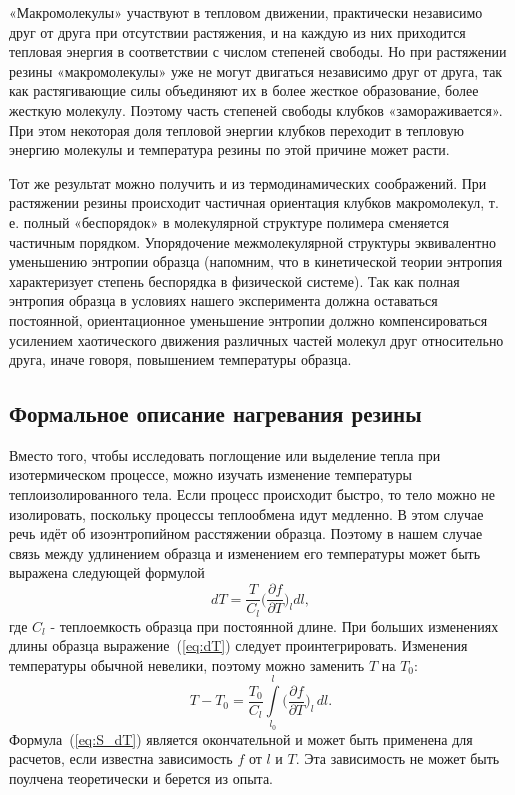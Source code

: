 \documentclass[a4paper,12pt]{article} %
\begin{document}
		«Макромолекулы» участвуют в тепловом движении, практически независимо друг от друга при отсутствии растяжения, и на каждую из них приходится тепловая энергия в соответствии с числом степеней свободы. Но при растяжении резины «макромолекулы» уже не могут двигаться независимо друг от друга, так как растягивающие силы объединяют их в более жесткое образование, более жесткую молекулу. Поэтому часть степеней свободы клубков «замораживается». При этом некоторая доля тепловой энергии клубков переходит в тепловую энергию молекулы и температура резины по этой причине может расти.
	
		Тот же результат можно получить и из термодинамических соображений. При растяжении резины происходит частичная ориентация клубков макромолекул, т. е. полный «беспорядок» в молекулярной структуре полимера сменяется частичным порядком. Упорядочение межмолекулярной структуры эквивалентно уменьшению энтропии образца (напомним, что в кинетической теории энтропия характеризует степень беспорядка в физической системе). Так как полная энтропия образца в условиях нашего эксперимента должна оставаться постоянной, ориентационное уменьшение энтропии должно компенсироваться усилением хаотического движения различных частей молекул друг относительно друга, иначе говоря, повышением температуры образца.
	
	\subsection{Формальное описание нагревания резины}
		Вместо того, чтобы исследовать поглощение или выделение тепла при изотермическом процессе, можно изучать изменение температуры теплоизолированного тела. Если процесс происходит быстро, то тело можно не изолировать, поскольку процессы теплообмена идут медленно. В этом случае речь идёт об изоэнтропийном расстяжении образца. Поэтому в нашем случае связь между удлинением образца и изменением его температуры может быть выражена следующей формулой
			\begin{equation} \label{eq:dT}
				dT = \frac{T}{C_l}\biggr(\frac{\partial f}{\partial T}\biggl)_l dl,
			\end{equation}
где $C_l$ - теплоемкость образца при постоянной длине. При больших изменениях длины образца выражение~(\ref{eq:dT}) следует проинтегрировать. Изменения температуры обычной невелики, поэтому можно заменить $T$ на $T_0$:
			\begin{equation} \label{eq:S_dT}
				T - T_0 = \frac{T_0}{C_l} \int\limits_{l_0}^l \biggr(\frac{\partial f}{\partial T}\biggl)_l\,dl.
			\end{equation}
Формула~(\ref{eq:S_dT}) является окончательной и может быть применена для расчетов, если известна зависимость $f$ от $l$ и $T$. Эта зависимость не может быть поулчена теоретически и берется из опыта.
		
\end{document}
